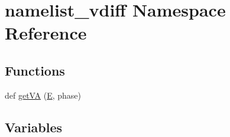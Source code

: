 \hypertarget{namespacenamelist__vdiff}{}\section{namelist\+\_\+vdiff Namespace Reference}
\label{namespacenamelist__vdiff}
\subsection*{Functions}
\begin{DoxyCompactItemize}
\item 
def \hyperlink{namespacenamelist__vdiff_a9d02ceda75eead26e1d4310ad5320b3b}{get\+VA} (\hyperlink{namespacenamelist__vdiff_a14d10524740626b739dfa5d08bc60e53}{E}, phase)
\end{DoxyCompactItemize}
\subsection*{Variables}
